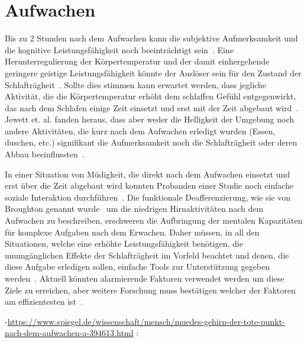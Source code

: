 \section{Aufwachen}\label{sec:relatedWork.aufwachen}

Bis zu 2 Stunden nach dem Aufwachen kann die subjektive Aufmerksamkeit und die kognitive Leistungsfähigkeit noch beeinträchtigt sein~\cite{jewett1999time}. Eine Herunterregulierung der Körpertemperatur und der damit einhergehende geringere geistige Leistungsfähigkeit könnte der Auslöser sein für den Zustand der Schlafträgheit~\cite{dinges1990you}. Sollte dies stimmen kann erwartet werden, dass jegliche Aktivität, die die Körpertemperatur erhöht dem schlaffen Gefühl entgegenwirkt, das nach dem Schlafen einige Zeit einsetzt und erst mit der Zeit abgebaut wird~\cite{jewett1999time}. Jewett et. al. fanden heraus, dass aber weder die Helligkeit der Umgebung noch andere Aktivitäten, die kurz nach dem Aufwachen erledigt wurden (Essen, duschen, etc.) signifikant die Aufmerksamkeit noch die Schlafträgheit oder deren Abbau beeinflussten~\cite{jewett1999time}.

In einer Situation von Müdigkeit, die direkt nach dem Aufwachen einsetzt und erst über die Zeit abgebaut wird konnten Probanden einer Studie noch einfache soziale Interaktion durchführen~\cite{dinges1990you}. Die funktionale Deafferenzierung, wie sie von Broughton genannt wurde~\cite{broughton1968sleep} um die niedrigen Hirnaktivitäten nach dem Aufwachen zu beschreiben, erschweren die Aufbringung der mentalen Kapazitäten für komplexe Aufgaben nach dem Erwachen. Daher müssen, in all den Situationen, welche eine erhöhte Leistungsfähigkeit benötigen, die unumgänglichen Effekte der Schlafträgheit im Vorfeld beachtet und denen, die diese Aufgabe erledigen sollen, einfache Tools zur Unterstützung gegeben werden~\cite{ferrara2000sleep}. Aktuell könnten alarmierende Faktoren verwendet werden um diese Ziele zu erreichen, aber weitere Forschung muss bestätigen welcher der Faktoren am effizientesten ist~\cite{ferrara2000sleep}.


-\url{https://www.spiegel.de/wissenschaft/mensch/muedes-gehirn-der-tote-punkt-nach-dem-aufwachen-a-394613.html} :

